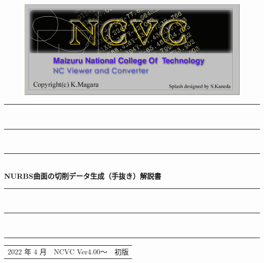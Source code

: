 
\vspace*{4zh}
\begin{figure}[H]
\centering
\includegraphics[scale=1.2]{logo.png}
\end{figure}

\vspace*{3zh}
\begin{center}
    \rule{12cm}{0.2zw}\\[-0.5zh]
    \rule{11cm}{0.1zw}\\[-0.5zh]
    \rule{10cm}{0.05zw}\\[1zh]
    {\Large \textbf{NURBS曲面の切削データ生成}}\textbf{（手抜き）}{\Large \textbf{解説書}}\\
    \rule{10cm}{0.05zw}\\[-0.5zh]
    \rule{11cm}{0.1zw}\\[-0.5zh]
    \rule{12cm}{0.2zw}

    \vspace*{7cm}
    \begin{table}[H]
        \centering
        \begin{tabular}{ccc}
            2022 年 4 月 & NCVC Ver4.00～ & 初版\\
        \end{tabular}
    \end{table}
\end{center}
